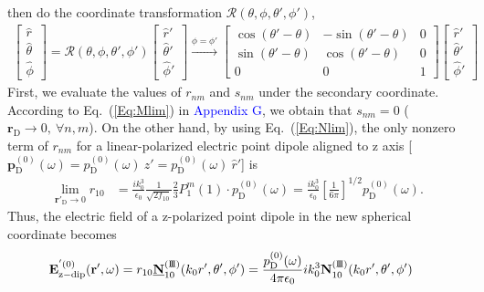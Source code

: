 \documentclass[journal=jacsat,manuscript=article,layout=traditional]{achemso}
\newcommand*\blue[1]{\textcolor{blue}{#1}}
\newcommand{\norF}[1]{\underline{\vb{#1}}}
\newcommand{\joinR}{\hspace{-.17em}}
\newcommand{\RomanI}{\scriptsize\textrm{I}}
\newcommand{\RomanIII}{\mbox{\RomanI\joinR\RomanI\joinR\RomanI}}
\begin{document}
then do the coordinate transformation $\mathcal{R}(\theta,\phi,\theta',\phi')$,
\begin{align}
    \begin{bmatrix}
    \hat{r}\\ \hat{\theta}\\ \hat{\phi}
    \end{bmatrix}=\mathcal{R}(\theta,\phi,\theta',\phi')
    \begin{bmatrix}
    \hat{r}'\\ \hat{\theta}'\\ \hat{\phi}'
    \end{bmatrix}
    \xrightarrow{\phi=\phi'}
    \begin{bmatrix}
    \cos(\theta'-\theta) & -\sin(\theta'-\theta) & 0 \\
    \sin(\theta'-\theta) & \cos(\theta'-\theta) & 0 \\
    0 & 0 & 1
    \end{bmatrix}
    \begin{bmatrix}
    \hat{r}'\\ \hat{\theta}'\\ \hat{\phi}'
    \end{bmatrix}
\end{align}
First, we evaluate the values of $r_{nm}$ and $s_{nm}$ under the secondary coordinate.
According to Eq.~(\ref{Eq:Mlim}) in \blue{Appendix G}, we obtain that $s_{nm}=0$ ($\mathbf{r}_\mathrm{D}\rightarrow0,~\forall n,m$).
On the other hand, by using Eq.~(\ref{Eq:Nlim}),
the only nonzero term of $r_{nm}$ for a linear-polarized electric point dipole aligned to z axis  [$\mathbf{p}_\mathrm{D}^{(0)}(\omega)=p_\mathrm{D}^{(0)}(\omega)~\hat{z}'=p_\mathrm{D}^{(0)}(\omega)~\hat{r}'$] is
\begin{align}
    \lim_{\mathbf{r}'_\mathrm{D}\rightarrow0}r_{10}&=
    \frac{ik_0^3}{\epsilon_0}\frac{1}{\sqrt{2f_{10}}}\frac{2}{3}P_1^m(1)\cdot p_\mathrm{D}^{(0)}(\omega)=
    \frac{ik_0^3}{\epsilon_0}\left[\frac{1}{6\pi}\right]^{1/2} p_\mathrm{D}^{(0)}(\omega).
\end{align}
Thus, the electric field of a z-polarized point dipole in the new spherical coordinate becomes
\begin{align}
    \mathbf{E}_\mathrm{z-dip}^{'(0)}(\mathbf{r}',\omega)= r_{10}\norF{N}_{\mathstrut{10}}^{(\RomanIII)}(k_0r',\theta',\phi')
    &=\frac{p_\mathrm{D}^{(0)}(\omega)}{4\pi\epsilon_0}ik_0^3\mathbf{N}_{\mathstrut{10}}^{(\RomanIII)}(k_0r',\theta',\phi')
    \label{Eq:zdipoleimp}
\end{align}
\end{document}
